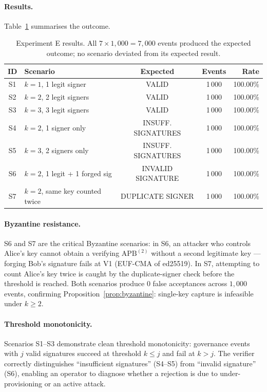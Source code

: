 \documentclass[11pt]{article}
\newcommand{\APB}{\mathrm{APB}}
\begin{document}
\paragraph{Results.} Table~\ref{tab:exp_e} summarises the outcome.

\begin{table}[h]
\centering
\caption{Experiment E results. All $7 \times 1{,}000 = 7{,}000$ events
produced the expected outcome; no scenario deviated from its
expected result.}
\label{tab:exp_e}
\small
\begin{tabular}{clccr}
\toprule
ID & Scenario & Expected & Events & Rate \\
\midrule
S1 & $k=1$, 1 legit signer              & VALID                  & 1\,000 & 100.00\% \\
S2 & $k=2$, 2 legit signers             & VALID                  & 1\,000 & 100.00\% \\
S3 & $k=3$, 3 legit signers             & VALID                  & 1\,000 & 100.00\% \\
S4 & $k=2$, 1 signer only               & INSUFF. SIGNATURES     & 1\,000 & 100.00\% \\
S5 & $k=3$, 2 signers only              & INSUFF. SIGNATURES     & 1\,000 & 100.00\% \\
S6 & $k=2$, 1 legit + 1 forged sig      & INVALID SIGNATURE      & 1\,000 & 100.00\% \\
S7 & $k=2$, same key counted twice      & DUPLICATE SIGNER       & 1\,000 & 100.00\% \\
\bottomrule
\end{tabular}
\end{table}

\paragraph{Byzantine resistance.}
S6 and S7 are the critical Byzantine scenarios: in S6, an attacker
who controls Alice's key cannot obtain a verifying $\APB^{(2)}$
without a second legitimate key --- forging Bob's signature fails
at V1 (EUF-CMA of ed25519). In S7, attempting to count Alice's
key twice is caught by the duplicate-signer check before the
threshold is reached. Both scenarios produce $0$ false acceptances
across $1{,}000$ events, confirming Proposition~\ref{prop:byzantine}:
single-key capture is infeasible under $k \geq 2$.

\paragraph{Threshold monotonicity.}
Scenarios S1--S3 demonstrate clean threshold monotonicity:
governance events with $j$ valid signatures succeed at threshold
$k \leq j$ and fail at $k > j$. The verifier correctly
distinguishes ``insufficient signatures'' (S4--S5) from ``invalid
signature'' (S6), enabling an operator to diagnose whether a
rejection is due to under-provisioning or an active attack.
\end{document}
